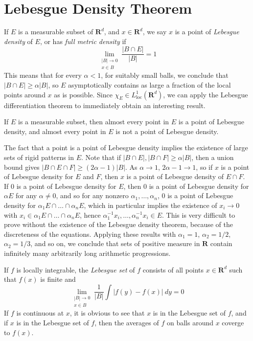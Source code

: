 \section{Lebesgue Density Theorem}

If $E$ is a measurable subset of $\mathbf{R}^d$, and $x \in \mathbf{R}^d$, we say $x$ is a point of \emph{Lebesgue density} of $E$, or has \emph{full metric density} if
%
\[ \lim_{\substack{|B| \to 0\\x \in B}} \frac{|B \cap E|}{|B|} = 1 \]
%
This means that for every $\alpha < 1$, for suitably small balls, we conclude that $|B \cap E| \geq \alpha |B|$, so $E$ asymptotically contains as large a fraction of the local points around $x$ as is possible. Since $\chi_E \in L^1_{\text{loc}}(\mathbf{R}^d)$, we can apply the Lebesgue differentiation theorem to immediately obtain an interesting result.

\begin{theorem}
    If $E$ is a measurable subset, then almost every point in $E$ is a point of Lebesgue density, and almost every point in $E$ is not a point of Lebesgue density.
\end{theorem}

The fact that a point is a point of Lebesgue density implies the existence of large sets of rigid patterns in $E$. Note that if $|B \cap E|, |B \cap F| \geq \alpha |B|$, then a union bound gives $|B \cap E \cap F| \geq (2 \alpha - 1)|B|$. As $\alpha \to 1$, $2\alpha - 1 \to 1$, so if $x$ is a point of Lebesgue density for $E$ and $F$, then $x$ is a point of Lebesgue density of $E \cap F$. If $0$ is a point of Lebesgue density for $E$, then $0$ is a point of Lebesgue density for $\alpha E$ for any $\alpha \neq 0$, and so for any nonzero $\alpha_1, \dots, \alpha_n$, $0$ is a point of Lebesgue density for $\alpha_1 E \cap \dots \cap \alpha_n E$, which in particular implies the existence of $x_i \to 0$ with $x_i \in \alpha_1 E \cap \dots \cap \alpha_n E$, hence $\alpha_1^{-1} x_i, \dots, \alpha_n^{-1} x_i \in E$. This is very difficult to prove without the existence of the Lebesgue density theorem, because of the discreteness of the equations. Applying these results with $\alpha_1 = 1$, $\alpha_2 = 1/2$, $\alpha_2 = 1/3$, and so on, we conclude that sets of positive measure in $\mathbf{R}$ contain infinitely many arbitrarily long arithmetic progressions.

If $f$ is locally integrable, the \emph{Lebesgue set} of $f$ consists of all points $x \in \mathbf{R}^d$ such that $f(x)$ is finite and
%
\[ \lim_{\substack{|B| \to 0\\x \in B}} \frac{1}{|B|} \int |f(y) - f(x)|\ dy = 0 \]
%
If $f$ is continuous at $x$, it is obvious to see that $x$ is in the Lebesgue set of $f$, and if $x$ is in the Lebesgue set of $f$, then the averages of $f$ on balls around $x$ coverge to $f(x)$.

